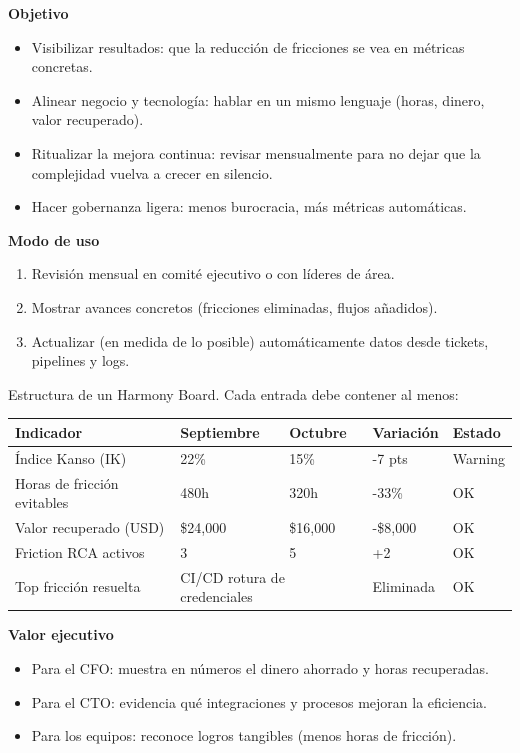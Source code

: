 \textbf{Objetivo} 
\begin{itemize}
    \item Visibilizar resultados: que la reducción de fricciones se vea en métricas concretas.
    \item Alinear negocio y tecnología: hablar en un mismo lenguaje (horas, dinero, valor recuperado).
    \item Ritualizar la mejora continua: revisar mensualmente para no dejar que la complejidad vuelva a crecer en silencio.
    \item Hacer gobernanza ligera: menos burocracia, más métricas automáticas.
\end{itemize}

\textbf{Modo de uso} 
\begin{enumerate}
    \item Revisión mensual en comité ejecutivo o con líderes de área.
    \item Mostrar avances concretos (fricciones eliminadas, flujos añadidos).
    \item Actualizar (en medida de lo posible) automáticamente datos desde tickets, pipelines y logs.
\end{enumerate}


Estructura de un Harmony Board. Cada entrada debe contener al menos:

\begin{center}
\begin{tabular}{|p{4cm}|l|l|l|l|}
\hline
Indicador & Septiembre & Octubre & Variación & Estado \\ \hline
Índice Kanso (IK) & 22\% & 15\% & -7 pts & Warning \\ \hline
Horas de fricción evitables & 480h & 320h & -33\% & OK \\ \hline
Valor recuperado (USD) & \$24,000 & \$16,000 & -\$8,000 & OK \\ \hline
Friction RCA activos & 3 & 5 & +2 & OK \\ \hline
Top fricción resuelta & \multicolumn{2}{|l|}{CI/CD rotura de credenciales} & Eliminada & OK \\ \hline
\end{tabular}
\end{center}

\textbf{Valor ejecutivo}
\begin{itemize}
    \item Para el CFO: muestra en números el dinero ahorrado y horas recuperadas.
    \item Para el CTO: evidencia qué integraciones y procesos mejoran la eficiencia.
    \item Para los equipos: reconoce logros tangibles (menos horas de fricción).
\end{itemize}


